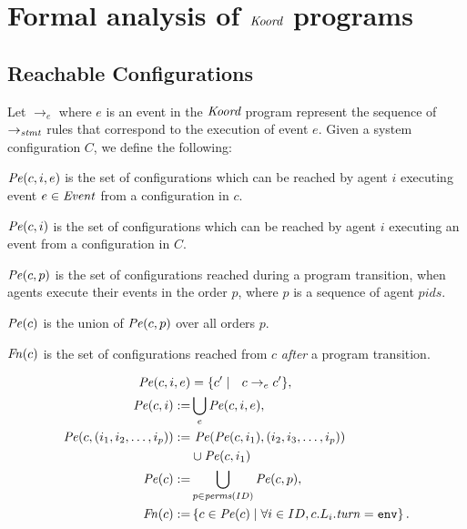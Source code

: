 \section{Formal analysis of $\emph{Koord}$ programs}
\label{sec:verification}

\subsection{Reachable Configurations}
Let $\rightarrow_{e}$ where $e$ is an event in the $\emph{Koord}$ program represent the sequence of $\rightarrow_\mathit{stmt}$ rules that correspond to the execution of event $e$. Given a system configuration $C$, we define the following:
 \begin{inparaenum}[(i)]
     \item $\mathit{Pe}(c,i,e)$ is the set of configurations which can be reached by agent $i$ executing event $e \in \mathit{Event}$ from a configuration in $c$.
     \item$\mathit{Pe}(c,i)$ is the set of configurations which can be reached by agent $i$ executing an event from a configuration in $C$.
     \item$\mathit{Pe}(c,p)$ is the set of configurations reached during a program transition, when agents execute their events in the order $p$, where $p$ is a sequence of agent $\mathit{pids}$.
     \item $\mathit{Pe}(c)$ is the union of $\mathit{Pe}(c,p)$ over all orders $p$.
     \item$\mathit{Fn}(c)$ is the set of configurations reached from $c$ \emph{after} a program transition.
 \end{inparaenum}
\vspace{1mm}
\begin{mdframed}
\footnotesize
\begin{align*}
    \Post (c,i,e) &= \{ c^\prime\mid \ \ c\rightarrow_{e} c^\prime \},\\
\Post(c,i) :=& \bigcup_e \Post(c,i,e),\\
\Post(c,(i_1,i_2,\ldots ,i_p)) := & \ \Post(\Post(c,i_1),(i_2,i_3,\ldots,i_p))\\ & \cup \Post(c,i_1)\\
\Post(c) :=& \bigcup_{p\in \mathit{perms}(\UINS)} \Post(c,p), \\
\Final(c) :=& \left\{ c\in \Post(c)\mid \forall i \in \UINS, c.L_i.\turn = \env \right\}.
\end{align*}
\end{mdframed}

